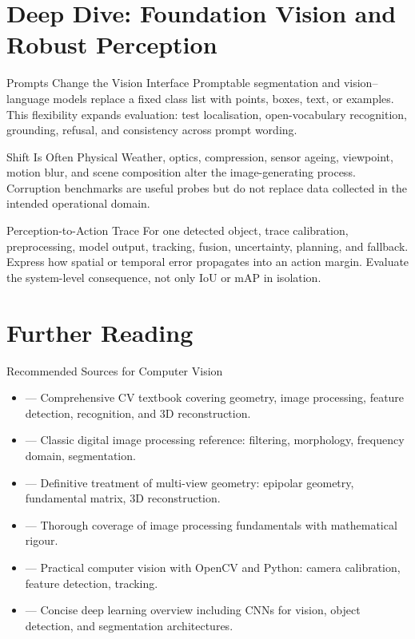 \section{Deep Dive: Foundation Vision and Robust Perception}
\begin{v3topic}{Prompts Change the Vision Interface}
Promptable segmentation and vision--language models replace a fixed class list
with points, boxes, text, or examples.
This flexibility expands evaluation: test localisation, open-vocabulary
recognition, grounding, refusal, and consistency across prompt wording.

\end{v3topic}
\begin{v3topic}{Shift Is Often Physical}
Weather, optics, compression, sensor ageing, viewpoint, motion blur, and scene
composition alter the image-generating process.
Corruption benchmarks are useful probes but do not replace data collected in
the intended operational domain.

\end{v3topic}
\begin{v3topic}{Perception-to-Action Trace}
For one detected object, trace calibration, preprocessing, model output,
tracking, fusion, uncertainty, planning, and fallback.
Express how spatial or temporal error propagates into an action margin.
Evaluate the system-level consequence, not only IoU or mAP in isolation.
\end{v3topic}


\section{Further Reading}

\begin{v3topic}{Recommended Sources for Computer Vision}
    \begin{itemize}
        \item {} --- Comprehensive CV textbook covering geometry, image processing, feature detection, recognition, and 3D reconstruction.
        \item {} --- Classic digital image processing reference: filtering, morphology, frequency domain, segmentation.
        \item {} --- Definitive treatment of multi-view geometry: epipolar geometry, fundamental matrix, 3D reconstruction.
        \item {} --- Thorough coverage of image processing fundamentals with mathematical rigour.
        \item {} --- Practical computer vision with OpenCV and Python: camera calibration, feature detection, tracking.
        \item {} --- Concise deep learning overview including CNNs for vision, object detection, and segmentation architectures.
    \end{itemize}
\end{v3topic}
